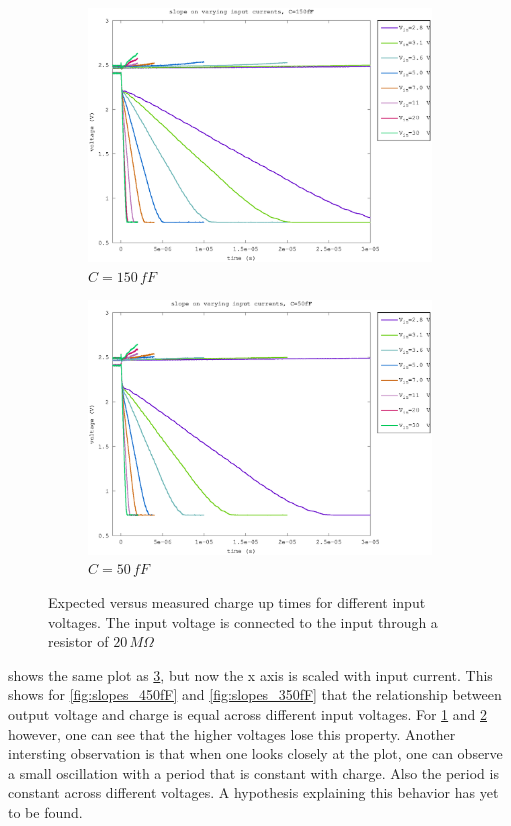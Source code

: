 \begin{figure}[h]
\begin{subfigure}[b]{0.475\textwidth}
	    \includegraphics[width=\textwidth]{fig/slope_150fF.eps}
	    \caption[]%
	    {$C=150\,fF$}    
	    \label{fig:slopes_150fF}
	\end{subfigure}
	\quad
	\begin{subfigure}[b]{0.475\textwidth}   
	    \centering 
	    \includegraphics[width=\textwidth]{fig/slope_50fF.eps}
	    \caption[]%
	    {$C=50\,fF$}    
	    \label{fig:slopes_50fF}
	\end{subfigure}
	\caption{Expected versus measured charge up times for different input voltages. The input voltage is connected to the input through a resistor of $20\,M\Omega$}
	\label{fig:slopes}
\end{figure}

 shows the same plot as \cref{fig:slopes}, but now the x axis is scaled with input current. This shows for \cref{fig:slopes_450fF} and \ref{fig:slopes_350fF} that the relationship between output voltage and charge is equal across different input voltages. For \cref{fig:slopes_150fF} and \ref{fig:slopes_50fF} however, one can see that the higher voltages lose this property. Another intersting observation is that when one looks closely at the plot, one can observe a small oscillation with a period that is constant with charge. Also the period is constant across different voltages. A hypothesis explaining this behavior has yet to be found.


